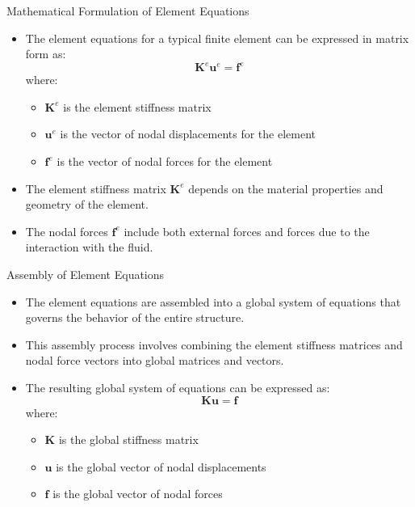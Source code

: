 \documentclass{beamer}
\begin{document}
\begin{frame}{Mathematical Formulation of Element Equations}
    \begin{itemize}
        \item The element equations for a typical finite element can be expressed in matrix form as:
        \begin{equation*}
        \mathbf{K}^e \mathbf{u}^e = \mathbf{f}^e
        \end{equation*}
        where:
        \begin{itemize}
            \item $\mathbf{K}^e$ is the element stiffness matrix
            \item $\mathbf{u}^e$ is the vector of nodal displacements for the element
            \item $\mathbf{f}^e$ is the vector of nodal forces for the element
        \end{itemize}
        \item The element stiffness matrix $\mathbf{K}^e$ depends on the material properties and geometry of the element.
        \item The nodal forces $\mathbf{f}^e$ include both external forces and forces due to the interaction with the fluid.
    \end{itemize}
\end{frame}

\begin{frame}{Assembly of Element Equations}
    \begin{itemize}
        \item The element equations are assembled into a global system of equations that governs the behavior of the entire structure.
        \item This assembly process involves combining the element stiffness matrices and nodal force vectors into global matrices and vectors.
        \item The resulting global system of equations can be expressed as:
        \begin{equation*}
        \mathbf{K} \mathbf{u} = \mathbf{f}
        \end{equation*}
        where:
        \begin{itemize}
            \item $\mathbf{K}$ is the global stiffness matrix
            \item $\mathbf{u}$ is the global vector of nodal displacements
            \item $\mathbf{f}$ is the global vector of nodal forces
        \end{itemize}
    \end{itemize}
\end{frame}
\end{document}
